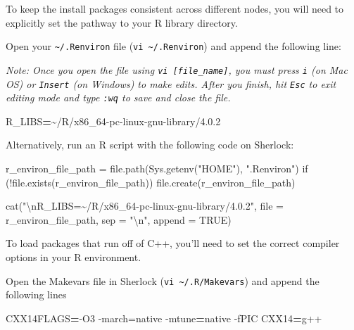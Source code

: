 \documentclass[
]{book}
\newenvironment{Shaded}{\begin{snugshade}}{\end{snugshade}}
\newcommand{\AttributeTok}[1]{\textcolor[rgb]{0.13,0.29,0.53}{#1}}
\newcommand{\ExtensionTok}[1]{#1}
\newcommand{\NormalTok}[1]{#1}
\newcommand{\OperatorTok}[1]{\textcolor[rgb]{0.81,0.36,0.00}{\textbf{#1}}}
\newcommand{\VariableTok}[1]{\textcolor[rgb]{0.00,0.00,0.00}{#1}}
\begin{document}
To keep the install packages consistent across different nodes, you will need to explicitly set the pathway to your R library directory.

Open your \texttt{\textasciitilde{}/.Renviron} file (\texttt{vi\ \textasciitilde{}/.Renviron}) and append the following line:

\emph{Note: Once you open the file using \texttt{vi\ {[}file\_name{]}}, you must press \texttt{i} (on Mac OS) or \texttt{Insert} (on Windows) to make edits. After you finish, hit \texttt{Esc} to exit editing mode and type \texttt{:wq} to save and close the file.}

\begin{Shaded}
\begin{Highlighting}[]
\VariableTok{R\_LIBS}\OperatorTok{=}\NormalTok{\textasciitilde{}/R/x86\_64{-}pc{-}linux{-}gnu{-}library/4.0.2}
\end{Highlighting}
\end{Shaded}

Alternatively, run an R script with the following code on Sherlock:

\begin{Shaded}
\begin{Highlighting}[]
\NormalTok{r\_environ\_file\_path = file.path(Sys.getenv("HOME"), ".Renviron")}
\NormalTok{if (!file.exists(r\_environ\_file\_path)) file.create(r\_environ\_file\_path)}

\NormalTok{cat("\textbackslash{}nR\_LIBS=\textasciitilde{}/R/x86\_64{-}pc{-}linux{-}gnu{-}library/4.0.2",}
\NormalTok{    file = r\_environ\_file\_path, sep = "\textbackslash{}n", append = TRUE)}
\end{Highlighting}
\end{Shaded}

To load packages that run off of C++, you'll need to set the correct compiler options in your R environment.

Open the Makevars file in Sherlock (\texttt{vi\ \textasciitilde{}/.R/Makevars}) and append the following lines

\begin{Shaded}
\begin{Highlighting}[]
\VariableTok{CXX14FLAGS}\OperatorTok{=}\NormalTok{{-}O3 }\ExtensionTok{{-}march=native} \AttributeTok{{-}mtune}\OperatorTok{=}\NormalTok{native }\AttributeTok{{-}fPIC}
\VariableTok{CXX14}\OperatorTok{=}\NormalTok{g++}
\end{Highlighting}
\end{Shaded}
\end{document}
